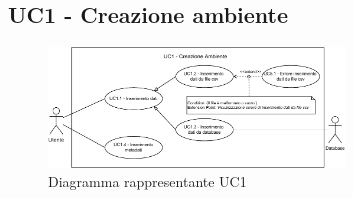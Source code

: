 \newpage
\subsection{UC1 - Creazione ambiente}
\label{sub:uc1}


\begin{figure}[h]
    \centering
    \includegraphics[width=0.7\textwidth]{componenti/casi-duso/diagrammi/UC1.pdf}
    \caption{Diagramma rappresentante UC1}
    \label{fig:UC1}
\end{figure}


